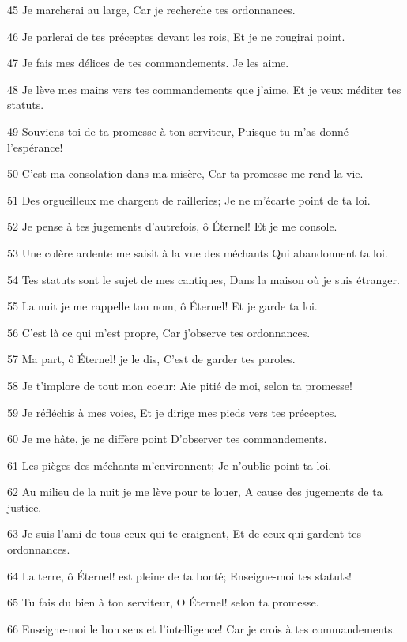 \par 45 Je marcherai au large, Car je recherche tes ordonnances.
\par 46 Je parlerai de tes préceptes devant les rois, Et je ne rougirai point.
\par 47 Je fais mes délices de tes commandements. Je les aime.
\par 48 Je lève mes mains vers tes commandements que j'aime, Et je veux méditer tes statuts.
\par 49 Souviens-toi de ta promesse à ton serviteur, Puisque tu m'as donné l'espérance!
\par 50 C'est ma consolation dans ma misère, Car ta promesse me rend la vie.
\par 51 Des orgueilleux me chargent de railleries; Je ne m'écarte point de ta loi.
\par 52 Je pense à tes jugements d'autrefois, ô Éternel! Et je me console.
\par 53 Une colère ardente me saisit à la vue des méchants Qui abandonnent ta loi.
\par 54 Tes statuts sont le sujet de mes cantiques, Dans la maison où je suis étranger.
\par 55 La nuit je me rappelle ton nom, ô Éternel! Et je garde ta loi.
\par 56 C'est là ce qui m'est propre, Car j'observe tes ordonnances.
\par 57 Ma part, ô Éternel! je le dis, C'est de garder tes paroles.
\par 58 Je t'implore de tout mon coeur: Aie pitié de moi, selon ta promesse!
\par 59 Je réfléchis à mes voies, Et je dirige mes pieds vers tes préceptes.
\par 60 Je me hâte, je ne diffère point D'observer tes commandements.
\par 61 Les pièges des méchants m'environnent; Je n'oublie point ta loi.
\par 62 Au milieu de la nuit je me lève pour te louer, A cause des jugements de ta justice.
\par 63 Je suis l'ami de tous ceux qui te craignent, Et de ceux qui gardent tes ordonnances.
\par 64 La terre, ô Éternel! est pleine de ta bonté; Enseigne-moi tes statuts!
\par 65 Tu fais du bien à ton serviteur, O Éternel! selon ta promesse.
\par 66 Enseigne-moi le bon sens et l'intelligence! Car je crois à tes commandements.
